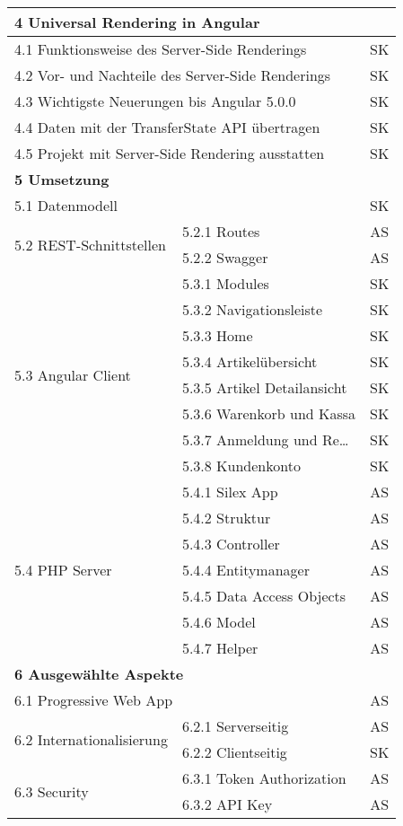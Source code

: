 \begin{longtable}{| l | l | c |}
\multicolumn{3}{|l|}{\textbf{4 Universal Rendering in Angular}} \\ \hline
\multicolumn{2}{|l|}{4.1 Funktionsweise des Server-Side Renderings} & SK \\
\multicolumn{2}{|l|}{4.2 Vor- und Nachteile des Server-Side Renderings} & SK \\
\multicolumn{2}{|l|}{4.3 Wichtigste Neuerungen bis Angular 5.0.0} & SK \\
\multicolumn{2}{|l|}{4.4 Daten mit der TransferState API übertragen} & SK \\
\multicolumn{2}{|l|}{4.5 Projekt mit Server-Side Rendering ausstatten} & SK \\ \hline

\multicolumn{3}{|l|}{\textbf{
5 Umsetzung}} \\ \hline
\multicolumn{2}{|l|}{5.1 Datenmodell} & SK \\ \hline
\multirow{2}{*}{5.2 REST-Schnittstellen}  
& 5.2.1 Routes & AS \\
& 5.2.2 Swagger & AS \\ \hline
\multirow{8}{*}{5.3 Angular Client}
& 5.3.1 Modules & SK \\
& 5.3.2 Navigationsleiste & SK \\
& 5.3.3 Home & SK \\
& 5.3.4 Artikelübersicht & SK \\
& 5.3.5 Artikel Detailansicht & SK \\
& 5.3.6 Warenkorb und Kassa & SK \\ 
& 5.3.7 Anmeldung und Re\dots & SK \\
& 5.3.8 Kundenkonto & SK \\ \hline
\multirow{7}{*}{5.4 PHP Server}
& 5.4.1 Silex App & AS \\
& 5.4.2 Struktur & AS \\
& 5.4.3 Controller & AS \\
& 5.4.4 Entitymanager & AS \\
& 5.4.5 Data Access Objects & AS \\
& 5.4.6 Model & AS \\ 
& 5.4.7 Helper & AS \\ \hline

\multicolumn{3}{|l|}{\textbf{
6 Ausgewählte Aspekte}} \\ \hline
\multicolumn{2}{|l|}{6.1 Progressive Web App} & AS \\ \hline
\multirow{2}{*}{6.2 Internationalisierung }  
& 6.2.1 Serverseitig & AS \\
& 6.2.2 Clientseitig & SK \\ \hline
\multirow{2}{*}{6.3 Security}
& 6.3.1 Token Authorization & AS \\
&6.3.2 API Key & AS \\ \hline


\end{longtable}
